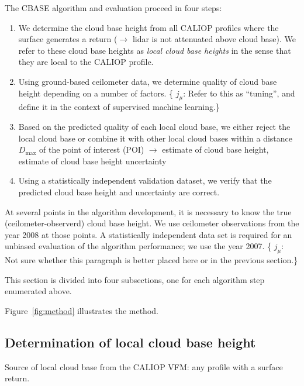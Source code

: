 \documentclass[amt,manuscript]{copernicus}\usepackage[]{graphicx}\usepackage[]{color}
\newcommand{\hlnum}[1]{\textcolor[rgb]{0.686,0.059,0.569}{#1}}%
\newcommand\comment[2]{\{\hlnum{ \textit{#1}: #2}\}}
\newcommand\commentjm[1]{\comment{$j_\mu$}{#1}}
\begin{document}
The CBASE algorithm and evaluation proceed in four steps:
\begin{enumerate}
\item We determine the cloud base height from all CALIOP profiles where the
  surface generates a return ($\longrightarrow$ lidar is not attenuated above
  cloud base).  We refer to these cloud base heights as \textit{local cloud base
    heights} in the sense that they are local to the CALIOP profile.
\item Using ground-based ceilometer data, we determine quality of cloud base
  height depending on a number of factors.  \commentjm{Refer to this as
    ``tuning'', and define it in the context of supervised machine learning.}
\item Based on the predicted quality of each local cloud base, we either reject
  the local cloud base or combine it with other local cloud bases within a
  distance $D_\text{max}$ of the point of interest (POI) $\longrightarrow$
  estimate of cloud base height, estimate of cloud base height uncertainty
\item Using a statistically independent validation dataset, we verify that the
  predicted cloud base height and uncertainty are correct.
\end{enumerate}

At several points in the algorithm development, it is necessary to know the true
(ceilometer-observerd) cloud base height.  We use ceilometer observations from
the year 2008 at those points.  A statistically independent data set is required
for an unbiased evaluation of the algorithm performance; we use the year
2007. \commentjm{Not sure whether this paragraph is better placed here or in the
previous section.}

This section is divided into four subsections, one for each algorithm step
enumerated above.

Figure~\ref{fig:method} illustrates the method.

\subsection{Determination of local cloud base height}
\label{sec:algorithm:local}
Source of local cloud base from the CALIOP VFM: any profile with a surface
return.  
\end{document}
